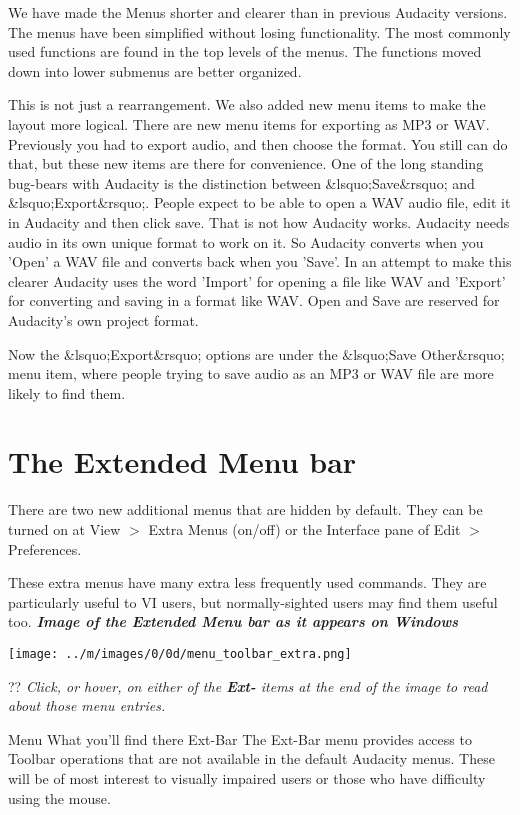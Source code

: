 \documentclass[twocolumn]{book}
\begin{document}
We have made the Menus shorter and clearer than in previous Audacity versions. The menus have been simplified without losing functionality. The most commonly used functions are found in the top levels of the menus. The functions moved down into lower submenus are better organized.

This is not just a rearrangement.  We also added new menu items to make the layout more logical.  There are new menu items for exporting as MP3 or WAV. Previously you had to export audio, and then choose the format. You still can do that, but these new items are there for convenience.
One of the long standing bug-bears with Audacity is the distinction between \&lsquo;Save\&rsquo; and \&lsquo;Export\&rsquo;. People expect to be able to open a WAV audio file, edit it in Audacity and then click save. That is not how Audacity works. Audacity needs audio in its own unique format to work on it. So Audacity converts when you 'Open' a WAV file and converts back when you 'Save'. In an attempt to make this clearer Audacity uses the word 'Import' for opening a file like WAV and 'Export' for converting and saving in a format like WAV. Open and Save are reserved for Audacity's own project format.

Now the \&lsquo;Export\&rsquo; options are under the \&lsquo;Save Other\&rsquo; menu item, where people trying to save audio as an MP3 or WAV file are more likely to find them. 



\section{The Extended Menu bar}


There are two new additional menus that are hidden by default.  They can be turned on at View \mbox{$>$} Extra Menus (on/off) or the Interface pane of Edit \mbox{$>$} Preferences.

These extra menus have many extra less frequently used commands.  They are particularly useful to VI users, but normally-sighted users may find them useful too.
\textit{\textbf{Image of the Extended Menu bar as it appears on Windows}}\par\texttt{[image: ../m/images/0/0d/menu\_toolbar\_extra.png]}\par??
\textit{Click, or hover, on either of the \textbf{Ext-} items at the end of the image to read about those menu entries.}

Menu
What you'll find there
Ext-Bar
The Ext-Bar menu provides access to Toolbar operations that are not available in the default Audacity menus. These will be of most interest to visually impaired users or those who have difficulty using the mouse.
\end{document}
